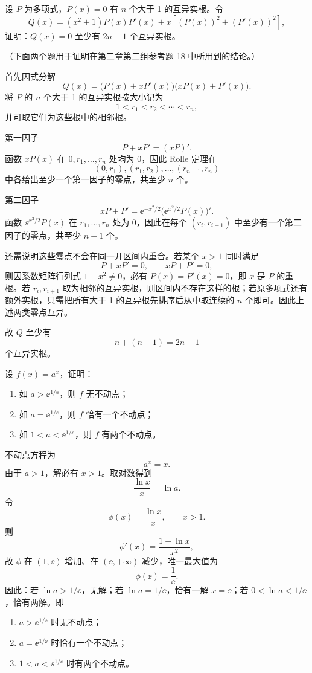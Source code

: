 \begin{xreferenceproblem}[16]
设 $P$ 为多项式，$P(x)=0$ 有 $n$ 个大于 1 的互异实根。令
  \[
    Q(x)=(x^2+1)P(x)P'(x)+x[(P(x))^2+(P'(x))^2],
  \]
  证明：$Q(x)=0$ 至少有 $2n-1$ 个互异实根。

  （下面两个题用于证明在第二章第二组参考题 18 中所用到的结论。）
\end{xreferenceproblem}
\begin{xsolution}
首先因式分解
\[
  Q(x)=\bigl(P(x)+xP'(x)\bigr)\bigl(xP(x)+P'(x)\bigr).
\]
将 $P$ 的 $n$ 个大于 1 的互异实根按大小记为
\[
  1<r_1<r_2<\cdots<r_n,
\]
并可取它们为这些根中的相邻根。

第一因子
\[
  P+xP'=(xP)'.
\]
函数 $xP(x)$ 在 $0,r_1,\ldots,r_n$ 处均为 0，因此 Rolle 定理在
\[
  (0,r_1),(r_1,r_2),\ldots,(r_{n-1},r_n)
\]
中各给出至少一个第一因子的零点，共至少 $n$ 个。

第二因子
\[
  xP+P'=\ee^{-x^2/2}\bigl(\ee^{x^2/2}P(x)\bigr)'.
\]
函数 $\ee^{x^2/2}P(x)$ 在 $r_1,\ldots,r_n$ 处为 0，因此在每个 $(r_i,r_{i+1})$ 中至少有一个第二因子的零点，共至少 $n-1$ 个。

还需说明这些零点不会在同一开区间内重合。若某个 $x>1$ 同时满足
\[
  P+xP'=0,\qquad xP+P'=0,
\]
则因系数矩阵行列式 $1-x^2\ne0$，必有 $P(x)=P'(x)=0$，即 $x$ 是 $P$ 的重根。若 $r_i,r_{i+1}$ 取为相邻的互异实根，则区间内不存在这样的根；若原多项式还有额外实根，只需把所有大于 1 的互异根先排序后从中取连续的 $n$ 个即可。因此上述两类零点互异。

故 $Q$ 至少有
\[
  n+(n-1)=\boxed{2n-1}
\]
个互异实根。
\end{xsolution}


\begin{xreferenceproblem}[17]
设 $f(x)=a^x$，证明：
  \begin{enumerate}[label=(\arabic*)]
    \item 如 $a>\ee^{1/\ee}$，则 $f$ 无不动点；
    \item 如 $a=\ee^{1/\ee}$，则 $f$ 恰有一个不动点；
    \item 如 $1<a<\ee^{1/\ee}$，则 $f$ 有两个不动点。
  \end{enumerate}
\end{xreferenceproblem}
\begin{xsolution}
不动点方程为
\[
  a^x=x.
\]
由于 $a>1$，解必有 $x>1$。取对数得到
\[
  \frac{\ln x}{x}=\ln a.
\]
令
\[
  \phi(x)=\frac{\ln x}{x},\qquad x>1.
\]
则
\[
  \phi'(x)=\frac{1-\ln x}{x^2},
\]
故 $\phi$ 在 $(1,\ee)$ 增加、在 $(\ee,+\infty)$ 减少，唯一最大值为
\[
  \phi(\ee)=\frac1\ee.
\]
因此：若 $\ln a>1/\ee$，无解；若 $\ln a=1/\ee$，恰有一解 $x=\ee$；若 $0<\ln a<1/\ee$，恰有两解。即
\begin{enumerate}[label=(\arabic*)]
  \item $a>\ee^{1/\ee}$ 时无不动点；
  \item $a=\ee^{1/\ee}$ 时恰有一个不动点；
  \item $1<a<\ee^{1/\ee}$ 时有两个不动点。
\end{enumerate}
\end{xsolution}



